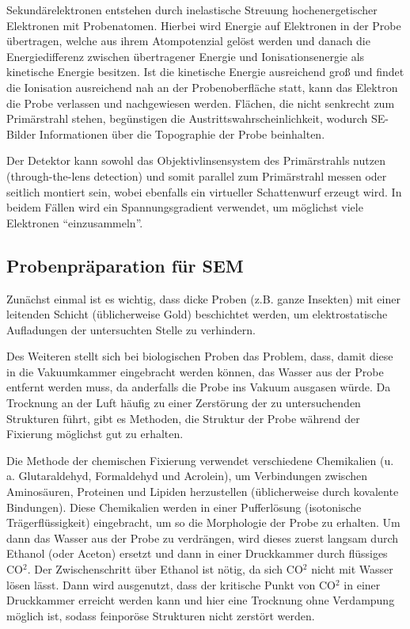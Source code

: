 Sekundärelektronen entstehen durch inelastische Streuung hochenergetischer Elektronen mit Probenatomen.
Hierbei wird Energie auf Elektronen in der Probe übertragen, welche aus ihrem Atompotenzial gelöst werden und danach die Energiedifferenz zwischen übertragener Energie und Ionisationsenergie als kinetische Energie besitzen.
Ist die kinetische Energie ausreichend groß und findet die Ionisation ausreichend nah an der Probenoberfläche statt, kann das Elektron die Probe verlassen und nachgewiesen werden. %
Flächen, die nicht senkrecht zum Primärstrahl stehen, begünstigen die Austrittswahrscheinlichkeit, wodurch SE-Bilder Informationen über die Topographie der Probe beinhalten.

Der Detektor kann sowohl das Objektivlinsensystem des Primärstrahls nutzen (through-the-lens detection) und somit parallel zum Primärstrahl messen oder seitlich montiert sein, wobei ebenfalls ein virtueller Schattenwurf erzeugt wird. \cite{springer-handbook}
In beidem Fällen wird ein Spannungsgradient verwendet, um möglichst viele Elektronen \enquote{einzusammeln}.

\subsection{Probenpräparation für SEM}

Zunächst einmal ist es wichtig, dass dicke Proben (z.B. ganze Insekten) mit einer leitenden Schicht (üblicherweise Gold) beschichtet werden, um elektrostatische Aufladungen der untersuchten Stelle zu verhindern.

Des Weiteren stellt sich bei biologischen Proben das Problem, dass, damit diese in die Vakuumkammer eingebracht werden können, das Wasser aus der Probe entfernt werden muss, da anderfalls die Probe ins Vakuum ausgasen würde.
Da Trocknung an der Luft häufig zu einer Zerstörung der zu untersuchenden Strukturen führt, gibt es Methoden, die Struktur der Probe während der Fixierung möglichst gut zu erhalten.

Die Methode der chemischen Fixierung verwendet verschiedene Chemikalien (u. a. Glutaraldehyd, Formaldehyd und Acrolein), um Verbindungen zwischen Aminosäuren, Proteinen und Lipiden herzustellen (üblicherweise durch kovalente Bindungen). \cite{bitesize}
Diese Chemikalien werden in einer Pufferlösung (isotonische Trägerflüssigkeit) eingebracht, um so die Morphologie der Probe zu erhalten.
Um dann das Wasser aus der Probe zu verdrängen, wird dieses zuerst langsam durch Ethanol (oder Aceton) ersetzt und dann in einer Druckkammer durch flüssiges CO$^2$.
Der Zwischenschritt über Ethanol ist nötig, da sich CO$^2$ nicht mit Wasser lösen lässt.
Dann wird ausgenutzt, dass der kritische Punkt von CO$^2$ in einer Druckkammer erreicht werden kann und hier eine Trocknung ohne Verdampung möglich ist, sodass feinporöse Strukturen nicht zerstört werden.

